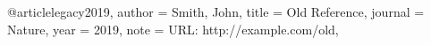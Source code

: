 @article{legacy2019,
  author = {Smith, John},
  title = {Old Reference},
  journal = {Nature},
  year = {2019},
  note = {URL: http://example.com/old},
}
